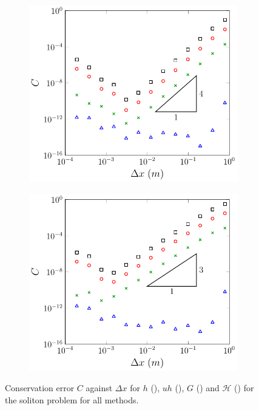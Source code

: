 \begin{figure}
\begin{subfigure}{0.5\textwidth}
		\vspace{0.3cm}
	\end{subfigure}
	\begin{subfigure}{0.5\textwidth}
		\includegraphics[width=\textwidth]{./chp5/figures/Analytic/Soliton/C1/D.pdf}
	\end{subfigure}%
	\begin{subfigure}{0.5\textwidth}
		\includegraphics[width=\textwidth]{./chp5/figures/Analytic/Soliton/C1/W.pdf}
	\end{subfigure}
	\caption{Conservation error $C$ against $\Delta x$ for $h$ (), $uh$ (), $G$ () and $\mathcal{H}$ ({}) for the soliton problem for all methods.}
	\label{fig:SolitonC1All}
\end{figure}

